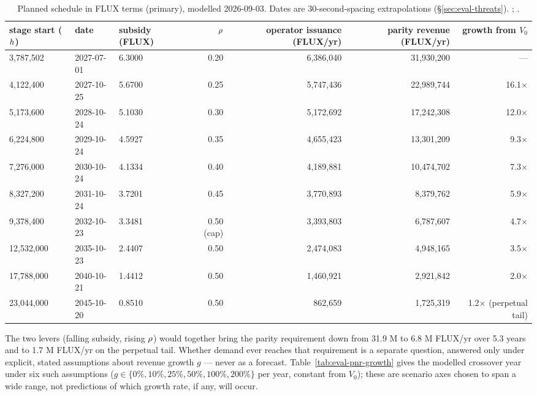 \begin{table}[H]
\centering
\small
\begin{tabular}{lllrrrr}
\toprule
stage start ($h$) & date & subsidy (FLUX) & $\rho$ & operator issuance (FLUX/yr) & parity revenue (FLUX/yr) & growth from $V_0$ \\
\midrule
3,787,502 & 2027-07-01 & 6.3000 & 0.20 & 6,386,040 & 31,930,200 & --- \\
4,122,400 & 2027-10-25 & 5.6700 & 0.25 & 5,747,436 & 22,989,744 & 16.1$\times$ \\
5,173,600 & 2028-10-24 & 5.1030 & 0.30 & 5,172,692 & 17,242,308 & 12.0$\times$ \\
6,224,800 & 2029-10-24 & 4.5927 & 0.35 & 4,655,423 & 13,301,209 & 9.3$\times$ \\
7,276,000 & 2030-10-24 & 4.1334 & 0.40 & 4,189,881 & 10,474,702 & 7.3$\times$ \\
8,327,200 & 2031-10-24 & 3.7201 & 0.45 & 3,770,893 & 8,379,762 & 5.9$\times$ \\
9,378,400 & 2032-10-23 & 3.3481 & 0.50 (cap) & 3,393,803 & 6,787,607 & 4.7$\times$ \\
12,532,000 & 2035-10-23 & 2.4407 & 0.50 & 2,474,083 & 4,948,165 & 3.5$\times$ \\
17,788,000 & 2040-10-21 & 1.4412 & 0.50 & 1,460,921 & 2,921,842 & 2.0$\times$ \\
23,044,000 & 2045-10-20 & 0.8510 & 0.50 & 862,659 & 1,725,319 & 1.2$\times$ (perpetual tail) \\
\bottomrule
\end{tabular}
\caption{Planned \PNR schedule in FLUX terms (primary), modelled 2026-09-03. Dates are 30-second-spacing
extrapolations (\S\ref{sec:eval-threats}). ;
.}
\label{tab:eval-pnr-flux}
\end{table}

The two levers (falling subsidy, rising $\rho$) would together bring the parity requirement
down from 31.9 M to 6.8 M FLUX/yr over 5.3 years and to 1.7 M FLUX/yr on the perpetual tail. Whether
demand ever reaches that requirement is a separate question, answered only under explicit,
stated assumptions about revenue growth $g$ — never as a forecast. Table~\ref{tab:eval-pnr-growth}
gives the modelled crossover year under six such assumptions ($g \in \{0\%, 10\%, 25\%, 50\%,
100\%, 200\%\}$ per year, constant from $V_0$); these are scenario axes chosen to span a wide
range, not predictions of which growth rate, if any, will occur.

